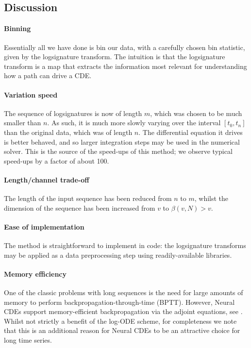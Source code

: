 \subsection{Discussion}
\paragraph{Binning} Essentially all we have done is bin our data, with a carefully chosen bin statistic, given by the logsignature transform. The intuition is that the logsignature transform is a map that extracts the information most relevant for understanding how a path can drive a CDE.

\paragraph{Variation speed} The sequence of logsignatures is now of length $m$, which was chosen to be much smaller than $n$. As such, it is much more slowly varying over the interval $[t_0, t_n]$ than the original data, which was of length $n$. The differential equation it drives is better behaved, and so larger integration steps may be used in the numerical solver. This is the source of the speed-ups of this method; we observe typical speed-ups by a factor of about 100.

\paragraph{Length/channel trade-off} The length of the input sequence has been reduced from $n$ to $m$, whilst the dimension of the sequence has been increased from $v$ to $\beta(v, N) > v$.

\paragraph{Ease of implementation} The method is straightforward to implement in code: the logsignature transforms may be applied as a data preprocessing step using readily-available libraries.

\paragraph{Memory efficiency} One of the classic problems with long sequences is the need for large amounts of memory to perform backpropagation-through-time (BPTT). However, Neural CDEs support memory-efficient backpropagation via the adjoint equations, see \citet{kidger2020neural}. Whilst not strictly a benefit of the log-ODE scheme, for completeness we note that this is an additional reason for Neural CDEs to be an attractive choice for long time series.

